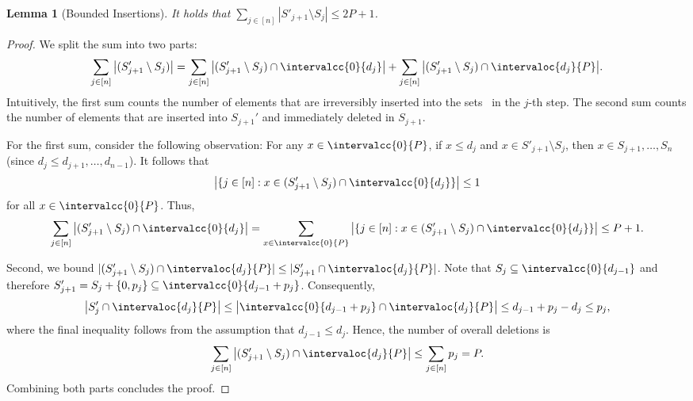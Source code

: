 \documentclass[10pt,a4paper]{article}
\newtheorem{lemma}{Lemma}[section]
\DeclarePairedDelimiter\set{\lbrace}{\rbrace}
\begin{document}
\begin{lemma}[Bounded Insertions]
    \label{lem:s-sets}
    It holds that $\sum_{j\in[n]} |S'_{j+1} \setminus S_{j}| \le 2P + 1$.
\end{lemma}
\begin{proof}
    We split the sum into two parts:
    \[
        \sum_{j\in[n]} \big|(S'_{j+1} \setminus S_{j})\big| = \sum_{j\in[n]} \big|(S'_{j+1} \setminus S_{j}) \cap \intervalcc{0}{d_j}\big| + \sum_{j\in[n]} \big|(S'_{j+1} \setminus S_{j}) \cap \intervaloc{d_j}{P}\big|.
    \]
    Intuitively, the first sum counts the number of elements that are irreversibly inserted into the sets~ in the $j$-th step.
    The second sum counts the number of elements that are inserted into $S_{j+1}'$ and immediately deleted in $S_{j+1}$.

    For the first sum, consider the following observation: For any $x \in \intervalcc{0}{P}$, if $x \le d_j$ and $x \in S'_{j+1} \setminus S_{j}$, then $x \in S_{j+1}, \dots , S_n$ (since $d_j \le d_{j+1}, \dots, d_{n-1}$).
    It follows that
    \[
        \big|\set{ j \in [n] : x \in (S'_{j+1} \setminus S_{j}) \cap \intervalcc{0}{d_j}}\big| \le 1
    \]
    for all $x \in \intervalcc{0}{P}$.
    Thus,
    \begin{align*}
        \sum_{j\in[n]} \big|(S'_{j+1} \setminus S_{j}) \cap \intervalcc{0}{d_j}\big| 
        =  \sum_{x\in\intervalcc{0}{P}} \big|\set{ j \in [n] : x \in (S'_{j+1} \setminus S_{j}) \cap \intervalcc{0}{d_j}}\big| 
        \le P + 1.
    \end{align*}   

    Second, we bound $|(S'_{j+1} \setminus S_{j}) \cap \intervaloc{d_j}{P}| \le |S'_{j+1} \cap \intervaloc{d_j}{P}|$.
    Note that $S_{j} \subseteq \intervalcc{0}{d_{j-1}}$ and therefore $S_{j+1}' = S_{j} + \set{0, p_j} \subseteq \intervalcc{0}{d_{j-1} + p_j}$.
    Consequently,
    \begin{align*}
        \big|S'_j \cap \intervaloc{d_j}{P} \big|
        \le \big| \intervalcc{0}{d_{j-1} + p_j} \cap  \intervaloc{d_j}{P} \big| 
        \le d_{j-1} + p_j - d_j 
        \le p_j,
    \end{align*}
    where the final inequality follows from the assumption that $d_{j-1} \le d_j$.
    Hence, the number of overall deletions is
    \[
        \sum_{j\in[n]} \big|(S'_{j+1} \setminus S_{j}) \cap \intervaloc{d_j}{P}\big| \le \sum_{j\in[n]} p_j = P.
    \]
    Combining both parts concludes the proof.
\end{proof}
\end{document}
